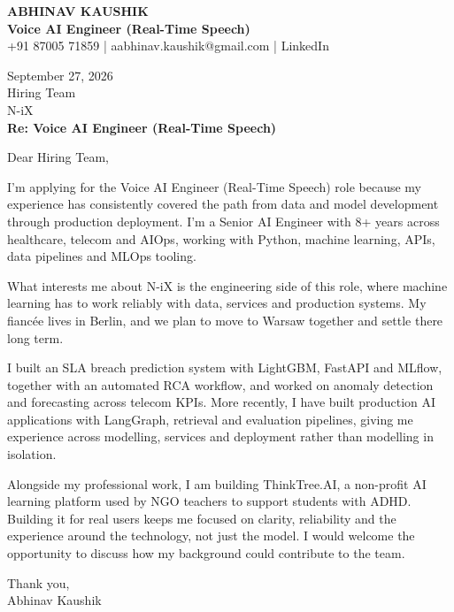 \documentclass[10pt,a4paper]{article}
\begin{document}
\begin{center}
{\Large\bfseries ABHINAV KAUSHIK}\\[2pt]
{\bfseries Voice AI Engineer (Real-Time Speech)}\\[2pt]
+91 87005 71859 \quad | \quad aabhinav.kaushik@gmail.com \quad | \quad LinkedIn
\end{center}
\vspace{8pt}
September 27, 2026\\[6pt]
Hiring Team\\
N-iX\\[4pt]
\textbf{Re: Voice AI Engineer (Real-Time Speech)}

Dear Hiring Team,

I’m applying for the Voice AI Engineer (Real-Time Speech) role because my experience has consistently covered the path from data and model development through production deployment. I’m a Senior AI Engineer with 8+ years across healthcare, telecom and AIOps, working with Python, machine learning, APIs, data pipelines and MLOps tooling.

What interests me about N-iX is the engineering side of this role, where machine learning has to work reliably with data, services and production systems. My fiancée lives in Berlin, and we plan to move to Warsaw together and settle there long term.

I built an SLA breach prediction system with LightGBM, FastAPI and MLflow, together with an automated RCA workflow, and worked on anomaly detection and forecasting across telecom KPIs. More recently, I have built production AI applications with LangGraph, retrieval and evaluation pipelines, giving me experience across modelling, services and deployment rather than modelling in isolation.

Alongside my professional work, I am building ThinkTree.AI, a non-profit AI learning platform used by NGO teachers to support students with ADHD. Building it for real users keeps me focused on clarity, reliability and the experience around the technology, not just the model. I would welcome the opportunity to discuss how my background could contribute to the team.

Thank you,\\
Abhinav Kaushik
\end{document}

